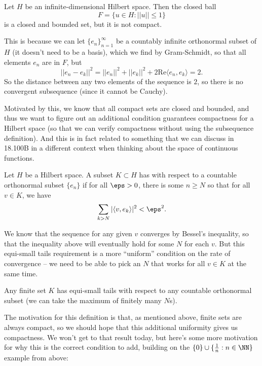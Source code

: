 \begin{example}
Let $H$ be an infinite-dimensional Hilbert space. Then the closed ball 
\[
    F = \{u \in H: ||u|| \le 1\}
\]
is a closed and bounded set, but it is not compact.
\end{example}

This is because we can let $\{e_n\}_{n=1}^{\infty}$ be a countably infinite orthonormal subset of $H$ (it doesn't need to be a basis), which we find by Gram-Schmidt, so that all elements $e_n$ are in $F$, but 
\[
    ||e_n - e_k||^2 = ||e_n||^2 + ||e_k||^2 + 2 \text{Re}\langle e_n, e_k \rangle = 2.
\]
So the distance between any two elements of the sequence is $2$, so there is no convergent subsequence (since it cannot be Cauchy).

Motivated by this, we know that all compact sets are closed and bounded, and thus we want to figure out an additional condition guarantees compactness for a Hilbert space (so that we can verify compactness without using the subsequence definition). And this is in fact related to something that we can discuss in 18.100B in a different context when thinking about the space of continuous functions.

\begin{definition}
Let $H$ be a Hilbert space. A subset $K \subset H$ has  with respect to a countable orthonormal subset $\{e_n\}$ if for all $\eps > 0$, there is some $n \ge N$ so that for all $v \in K$, we have
\[
    \sum_{k > N} |\langle v, e_k \rangle|^2 < \eps^2.
\]
\end{definition}

We know that the sequence for any given $v$ converges by Bessel's inequality, so that the inequality above will eventually hold for some $N$ for each $v$. But this equi-small tails requirement is a more ``uniform'' condition on the rate of convergence -- we need to be able to pick an $N$ that works for all $v \in K$ at the same time. 

\begin{example}
Any finite set $K$ has equi-small tails with respect to any countable orthonormal subset (we can take the maximum of finitely many $N$s). 
\end{example}

The motivation for this definition is that, as mentioned above, finite sets are always compact, so we should hope that this additional uniformity gives us compactness. We won't get to that result today, but here's some more motivation for why this is the correct condition to add, building on the $\{0\} \cup \{\frac{1}{n}: n \in \NN\}$ example from above:

